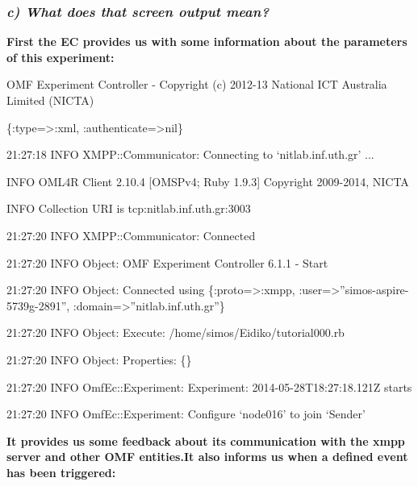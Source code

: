 \documentclass[letterpaper,10pt,english]{sphinxmanual}
\begin{document}
\subsubsection{\emph{c) What does that screen output mean?}}
\label{omf_example:c-what-does-that-screen-output-mean}
\begin{DUlineblock}{0em}
\item[] \textbf{First the EC provides us with some information about the parameters of this experiment:}
\end{DUlineblock}

\begin{DUlineblock}{0em}
\item[] OMF Experiment Controller - Copyright (c) 2012-13 National ICT Australia Limited (NICTA)
\item[] \{:type=\textgreater{}:xml, :authenticate=\textgreater{}nil\}
\item[] 21:27:18 INFO  XMPP::Communicator: Connecting to `nitlab.inf.uth.gr' ...
\item[] INFO  OML4R Client 2.10.4 {[}OMSPv4; Ruby 1.9.3{]} Copyright 2009-2014, NICTA
\item[] INFO  Collection URI is tcp:nitlab.inf.uth.gr:3003
\item[] 21:27:20 INFO  XMPP::Communicator: Connected
\item[] 21:27:20 INFO  Object: OMF Experiment Controller 6.1.1 - Start
\item[] 21:27:20 INFO  Object: Connected using \{:proto=\textgreater{}:xmpp, :user=\textgreater{}''simos-aspire-5739g-2891'', :domain=\textgreater{}''nitlab.inf.uth.gr''\}
\item[] 21:27:20 INFO  Object: Execute: /home/simos/Eidiko/tutorial000.rb
\item[] 21:27:20 INFO  Object: Properties: \{\}
\item[] 21:27:20 INFO  OmfEc::Experiment: Experiment: 2014-05-28T18:27:18.121Z starts
\item[] 21:27:20 INFO  OmfEc::Experiment: Configure `node016' to join `Sender'
\end{DUlineblock}

\begin{DUlineblock}{0em}
\item[] \textbf{It provides us some feedback about its communication with the xmpp server and other OMF entities.It also informs us when a defined event has been triggered:}
\end{DUlineblock}
\end{document}
